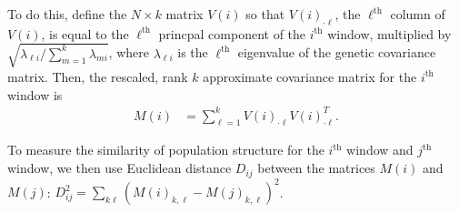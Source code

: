 \documentclass[11pt, oneside]{article}   	%
\begin{document}
To do this, define the $N \times k$ matrix $V(i)$ so that $V(i)_{\cdot \ell}$, 
the $\ell^\text{th}$ column of $V(i)$,
is equal to the $\ell^\text{th}$ princpal component of the $i^\text{th}$ window,
multiplied by $\sqrt{ \lambda_{\ell i} / \sum_{m=1}^k \lambda_{m i} }$,
where $\lambda_{\ell i}$ is the $\ell^\text{th}$ eigenvalue of the genetic covariance matrix.
Then, the rescaled, rank $k$ approximate covariance matrix for the $i^\text{th}$ window is
\begin{align} \label{eqn:est_cov}
    M(i) &= \sum_{\ell=1}^k V(i)_{\cdot \ell} V(i)_{\cdot \ell}^T .
\end{align}

To measure the similarity of population structure for the $i^\text{th}$ window and $j^\text{th}$ window,
we then use
Euclidean distance $D_{ij}$ between the matrices $M(i)$ and $M(j)$:
$D_{ij}^2 = \sum_{k\ell} ( M(i)_{k,\ell} - M(j)_{k,\ell} )^2$.
\end{document}
